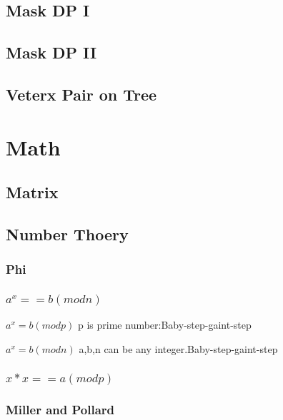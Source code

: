 \documentclass[a4paper,5pt,twocolumn,titlepage]{article}
\begin{document}
\begin{CJK*}{GBK}{song}
\subsection{Mask DP I}

\subsection{Mask DP II}

\subsection{Veterx Pair on Tree}

\section{Math}
    \subsection{Matrix}
        
    \subsection{Number Thoery}
        \subsubsection{Phi}
             
        \subsubsection{$a^x == b(mod n)$}
            $a^x=b(mod p)$ p is prime number:Baby-step-gaint-step
            
            $a^x=b(mod n)$ a,b,n can be any integer.Baby-step-gaint-step
            
        \subsubsection{$x*x == a (mod p)$}
            
        \subsubsection{Miller and Pollard}
            

\end{CJK*}
\end{document}
